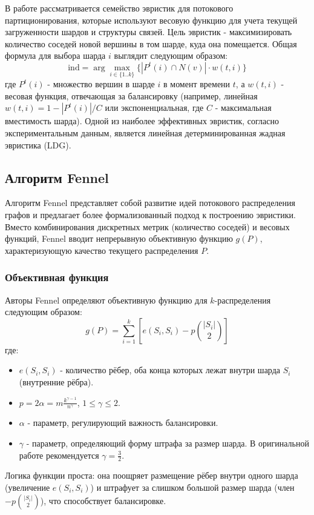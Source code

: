 В работе \cite{SGP} рассматривается семейство эвристик для потокового партиционирования, которые используют весовую функцию для учета текущей загруженности шардов и структуры связей. Цель эвристик - максимизировать количество соседей новой вершины в том шарде, куда она помещается. Общая формула для выбора шарда \(i\) выглядит следующим образом:
$$
\text{ind} = \arg\max_{i \in \{1..k\}} \{ |P^t(i) \cap N(v)| \cdot w(t, i) \}
$$
где \(P^t(i)\) - множество вершин в шарде \(i\) в момент времени \(t\), а \(w(t, i)\) - весовая функция, отвечающая за балансировку (например, линейная \(w(t, i) = 1 - |P^t(i)| / C\) или экспоненциальная, где \(C\) - максимальная вместимость шарда). Одной из наиболее эффективных эвристик, согласно экспериментальным данным, является линейная детерминированная жадная эвристика (LDG).

\subsection{Алгоритм Fennel}

Алгоритм Fennel \cite{Fennel} представляет собой развитие идей потокового распределения графов и предлагает более формализованный подход к построению эвристики. Вместо комбинирования дискретных метрик (количество соседей) и весовых функций, Fennel вводит непрерывную объективную функцию \(g(P)\), характеризующую качество текущего распределения \(P\).

\subsubsection{Объективная функция}

Авторы Fennel определяют объективную функцию для \(k\)-распределения следующим образом:
\begin{equation*}
    g(P)=\sum_{i=1}^k[e(S_i,S_i) - p\binom{|S_i|}{2}]
\end{equation*}
где:
\begin{itemize}
    \item \(e(S_i, S_i)\) - количество рёбер, оба конца которых лежат внутри шарда \(S_i\) (внутренние рёбра).
    \item $p=2\alpha=m\frac{k^{\gamma-1}}{n^\gamma}$, $1\le\gamma\le 2$.
    \item \(\alpha\) - параметр, регулирующий важность балансировки. 
    \item \(\gamma\) - параметр, определяющий форму штрафа за размер шарда. В оригинальной работе рекомендуется \(\gamma = \frac{3}{2}\).
\end{itemize}
Логика функции проста: она поощряет размещение рёбер внутри одного шарда (увеличение \(e(S_i, S_i)\)) и штрафует за слишком большой размер шарда (член \(- p\binom{|S_i|}{2}\)), что способствует балансировке.


